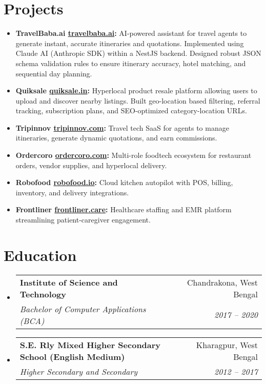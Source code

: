\documentclass[letterpaper,11pt]{article}
\makeatletter
\newcommand{\resumeItem}[2]{
  \item\small{
    \textbf{#1:} #2 \vspace{-2pt}
  }
}
\newcommand{\resumeSubheading}[4]{
  \vspace{-1pt}\item
    \begin{tabular*}{0.97\textwidth}{l@{\extracolsep{\fill}}r}
      \textbf{#1} & #2 \\
      \textit{\small#3} & \textit{\small #4} \\
    \end{tabular*}\vspace{-5pt}
}
\newcommand{\resumeSubItem}[2]{\resumeItem{#1}{#2}\vspace{-4pt}}
\newcommand{\resumeSubHeadingListStart}{\begin{itemize}[leftmargin=*]}
\newcommand{\resumeSubHeadingListEnd}{\end{itemize}}
\makeatother
\begin{document}
\section{Projects}
\resumeSubHeadingListStart
  \resumeSubItem{TravelBaba.ai \href{https://travelbaba.ai}{travelbaba.ai}}
    {AI-powered assistant for travel agents to generate instant, accurate itineraries and quotations. Implemented using Claude AI (Anthropic SDK) within a NestJS backend. Designed robust JSON schema validation rules to ensure itinerary accuracy, hotel matching, and sequential day planning.}
  \resumeSubItem{Quiksale \href{https://quiksale.in}{quiksale.in}}
    {Hyperlocal product resale platform allowing users to upload and discover nearby listings. Built geo-location based filtering, referral tracking, subscription plans, and SEO-optimized category-location URLs.}
  \resumeSubItem{Tripinnov \href{https://tripinnov.com}{tripinnov.com}}
    {Travel tech SaaS for agents to manage itineraries, generate dynamic quotations, and earn commissions.}
  \resumeSubItem{Ordercoro \href{https://ordercoro.com}{ordercoro.com}}
    {Multi-role foodtech ecosystem for restaurant orders, vendor supplies, and hyperlocal delivery.}
  \resumeSubItem{Robofood \href{https://robofood.io}{robofood.io}}
    {Cloud kitchen autopilot with POS, billing, inventory, and delivery integrations.}
  \resumeSubItem{Frontliner \href{https://frontliner.care}{frontliner.care}}
    {Healthcare staffing and EMR platform streamlining patient-caregiver engagement.}
\resumeSubHeadingListEnd


\section{Education}
\resumeSubHeadingListStart
  \resumeSubheading
    {Institute of Science and Technology}{Chandrakona, West Bengal}
    {Bachelor of Computer Applications (BCA)}{2017 – 2020}
  \resumeSubheading
    {S.E. Rly Mixed Higher Secondary School (English Medium)}{Kharagpur, West Bengal}
    {Higher Secondary and Secondary}{2012 – 2017}
\resumeSubHeadingListEnd
\end{document}

